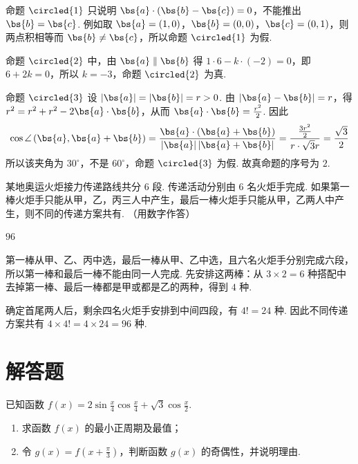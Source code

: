 \begin{solution}
命题 \(\circled{1}\) 只说明 \(\bs{a}\cdot(\bs{b}-\bs{c})=0\)，不能推出 \(\bs{b}=\bs{c}\). 例如取 \(\bs{a}=(1,0)\)，\(\bs{b}=(0,0)\)，\(\bs{c}=(0,1)\)，则两点积相等而 \(\bs{b}\ne\bs{c}\)，所以命题 \(\circled{1}\) 为假.

命题 \(\circled{2}\) 中，由 \(\bs{a}\parallel\bs{b}\) 得 \(1\cdot6-k\cdot(-2)=0\)，即 \(6+2k=0\)，所以 \(k=-3\)，命题 \(\circled{2}\) 为真.

命题 \(\circled{3}\) 设 \(|\bs{a}|=|\bs{b}|=r>0\). 由 \(|\bs{a}-\bs{b}|=r\)，得
\(r^2=r^2+r^2-2\bs{a}\cdot\bs{b}\)，从而 \(\bs{a}\cdot\bs{b}=\frac{r^2}{2}\). 因此
\[
\cos\angle\left(\bs{a},\bs{a}+\bs{b}\right)
=\frac{\bs{a}\cdot(\bs{a}+\bs{b})}{|\bs{a}|\,|\bs{a}+\bs{b}|}
=\frac{\frac{3r^2}{2}}{r\cdot\sqrt{3}r}=\frac{\sqrt{3}}{2}
\]
所以该夹角为 \(30^{\circ}\)，不是 \(60^{\circ}\)，命题 \(\circled{3}\) 为假. 故真命题的序号为 \(2\).
\end{solution}

\begin{problem}
某地奥运火炬接力传递路线共分 \(6\) 段. 传递活动分别由 \(6\) 名火炬手完成. 如果第一棒火炬手只能从甲，乙，丙三人中产生，最后一棒火炬手只能从甲，乙两人中产生，则不同的传递方案共有\fillinblank{}. （用数字作答）
\end{problem}

\begin{answer}
\(96\)
\end{answer}

\begin{solution}
第一棒从甲、乙、丙中选，最后一棒从甲、乙中选，且六名火炬手分别完成六段，所以第一棒和最后一棒不能由同一人完成. 先安排这两棒：从 \(3\times2=6\) 种搭配中去掉第一棒、最后一棒都是甲或都是乙的两种，得到 \(4\) 种.

确定首尾两人后，剩余四名火炬手安排到中间四段，有 \(4!=24\) 种. 因此不同传递方案共有
\(4\times4!=4\times24=96\) 种.
\end{solution}

\section{解答题}

\begin{problem}
已知函数 \( f(x) = 2\sin \frac{x}{4} \cos \frac{x}{4} + \sqrt{3} \cos \frac{x}{2} \).
\begin{enumerate}
\item 求函数 \( f(x) \) 的最小正周期及最值；
\item 令 \( g(x) = f\left(x + \frac{\pi}{3}\right) \)，判断函数 \( g(x) \) 的奇偶性，并说明理由.
\end{enumerate}
\end{problem}

